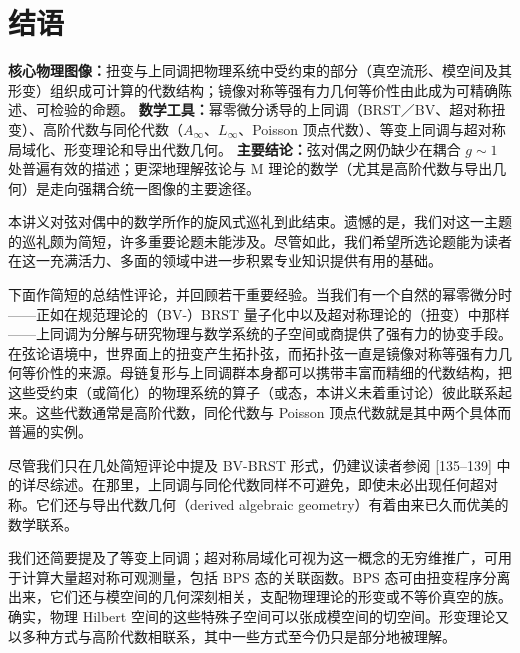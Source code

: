 
\section{结语}

\begin{keytakeaway}
\textbf{核心物理图像：}扭变与上同调把物理系统中受约束的部分（真空流形、模空间及其形变）组织成可计算的代数结构；镜像对称等强有力几何等价性由此成为可精确陈述、可检验的命题。
\textbf{数学工具：}幂零微分诱导的上同调（BRST／BV、超对称扭变）、高阶代数与同伦代数（$A_\infty$、$L_\infty$、Poisson 顶点代数）、等变上同调与超对称局域化、形变理论和导出代数几何。
\textbf{主要结论：}弦对偶之网仍缺少在耦合 $g\sim1$ 处普遍有效的描述；更深地理解弦论与 M 理论的数学（尤其是高阶代数与导出几何）是走向强耦合统一图像的主要途径。
\end{keytakeaway}

本讲义对弦对偶中的数学所作的旋风式巡礼到此结束。遗憾的是，我们对这一主题的巡礼颇为简短，许多重要论题未能涉及。尽管如此，我们希望所选论题能为读者在这一充满活力、多面的领域中进一步积累专业知识提供有用的基础。

下面作简短的总结性评论，并回顾若干重要经验。当我们有一个自然的幂零微分时——正如在规范理论的（BV-）BRST 量子化中以及超对称理论的（扭变）中那样——上同调为分解与研究物理与数学系统的子空间或商提供了强有力的协变手段。在弦论语境中，世界面上的扭变产生拓扑弦，而拓扑弦一直是镜像对称等强有力几何等价性的来源。母链复形与上同调群本身都可以携带丰富而精细的代数结构，把这些受约束（或简化）的物理系统的算子（或态，本讲义未着重讨论）彼此联系起来。这些代数通常是高阶代数，同伦代数与 Poisson 顶点代数就是其中两个具体而普遍的实例。

尽管我们只在几处简短评论中提及 BV-BRST 形式，仍建议读者参阅 [135--139] 中的详尽综述。在那里，上同调与同伦代数同样不可避免，即使未必出现任何超对称。它们还与导出代数几何（derived algebraic geometry）有着由来已久而优美的数学联系。

我们还简要提及了等变上同调；超对称局域化可视为这一概念的无穷维推广，可用于计算大量超对称可观测量，包括 BPS 态的关联函数。BPS 态可由扭变程序分离出来，它们还与模空间的几何深刻相关，支配物理理论的形变或不等价真空的族。确实，物理 Hilbert 空间的这些特殊子空间可以张成模空间的切空间。形变理论又以多种方式与高阶代数相联系，其中一些方式至今仍只是部分地被理解。


